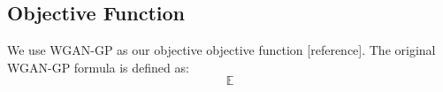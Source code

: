 \subsection{Objective Function}
We use WGAN-GP as our objective objective function [reference]. The original WGAN-GP formula is defined as:
\begin{equation}
\label{eqn:WGAN-GP}
\mathbb{E}
\end{equation}